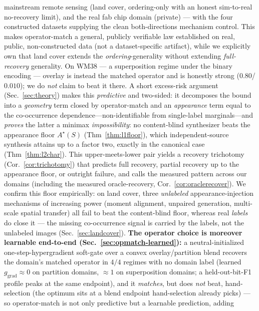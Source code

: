 \documentclass[11pt]{article}
\begin{document}
\begin{enumerate}
  mainstream remote sensing (land cover, ordering-only with an honest sim-to-real no-recovery
  limit), and the real fab chip domain (private) --- with the four constructed datasets
  supplying the clean both-directions mechanism control. This makes operator-match a general,
  publicly verifiable law established on real, public, non-constructed data (not a
  dataset-specific artifact), while we explicitly own that land cover extends the
  \emph{ordering}-generality without extending \emph{full-recovery} generality. On WM38 --- a superposition regime under the binary encoding
  --- overlay is instead the matched operator and is honestly strong ($0.80$/$0.010$); we
  do \emph{not} claim to beat it there. A short excess-risk argument
  (Sec.~\ref{sec:theory}) makes this \emph{predictive} and two-sided: it decomposes the bound
  into a \emph{geometry} term closed by operator-match and an \emph{appearance} term equal to the
  co-occurrence dependence---non-identifiable from single-label marginals---and \emph{proves} the
  latter a minimax \emph{impossibility}: no content-blind synthesizer beats the appearance floor
  $A^\star(S)$ (Thm~\ref{thm:l1floor}), which independent-source synthesis attains up to a factor
  two, exactly in the canonical case (Thm~\ref{thm:l2char}). This upper-meets-lower pair yields a
  recovery trichotomy (Cor.~\ref{cor:trichotomy}) that predicts full recovery, partial recovery up
  to the appearance floor, or outright failure, and calls the measured pattern across our domains
  (including the measured oracle-recovery, Cor.~\ref{cor:oraclerecover}).
  We confirm this floor empirically: on land cover, three \emph{unlabeled} appearance-injection
  mechanisms of increasing power (moment alignment, unpaired generation, multi-scale spatial
  transfer) all fail to beat the content-blind floor, whereas real \emph{labels} do close it ---
  the missing co-occurrence signal is carried by the labels, not the unlabeled images
  (Sec.~\ref{sec:landcover}).
  \textbf{The operator choice is moreover learnable end-to-end (Sec.~\ref{sec:opmatch-learned}):}
  a neutral-initialized one-step-hypergradient soft-gate over a convex overlay/partition blend
  recovers the domain's matched operator in $4/4$ regimes with no domain label (learned
  $g_{\text{grad}}{\approx}0$ on partition domains, ${\approx}1$ on superposition domains; a
  held-out-bit-F1 profile peaks at the same endpoint), and it \emph{matches}, but does
  \emph{not} beat, hand-selection (the optimum sits at a blend endpoint hand-selection already
  picks) --- so operator-match is not only predictive but a learnable prediction, adding

\end{enumerate}
\end{document}
